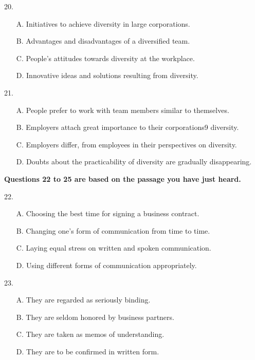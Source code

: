 \documentclass[UTF8,11pt]{ctexart}
\begin{document}
20.


\begin{itemize}[leftmargin=2em,itemsep=.2em,topsep=.4em]\item[A.] Initiatives to achieve diversity in large corporations.
\item[B.] Advantages and disadvantages of a diversified team.
\item[C.] People's attitudes towards diversity at the workplace.
\item[D.] Innovative ideas and solutions resulting from diversity.
\end{itemize}

21.


\begin{itemize}[leftmargin=2em,itemsep=.2em,topsep=.4em]\item[A.] People prefer to work with team members similar to themselves.
\item[B.] Employers attach great importance to their corporations9 diversity.
\item[C.] Employers differ, from employees in their perspectives on diversity.
\item[D.] Doubts about the practicability of diversity are gradually disappearing.
\end{itemize}

\textbf{Questions 22 to 25 are based on the passage you have just heard.}


22.


\begin{itemize}[leftmargin=2em,itemsep=.2em,topsep=.4em]\item[A.] Choosing the best time for signing a business contract.
\item[B.] Changing one's form of communication from time to time.
\item[C.] Laying equal stress on written and spoken communication.
\item[D.] Using different forms of communication appropriately.
\end{itemize}

23.


\begin{itemize}[leftmargin=2em,itemsep=.2em,topsep=.4em]\item[A.] They are regarded as seriously binding.
\item[B.] They are seldom honored by business partners.
\end{itemize}

\begin{itemize}[leftmargin=2em,itemsep=.2em,topsep=.4em]\item[C.] They are taken as memos of understanding.
\item[D.] They are to be confirmed in written form.
\end{itemize}
\end{document}
